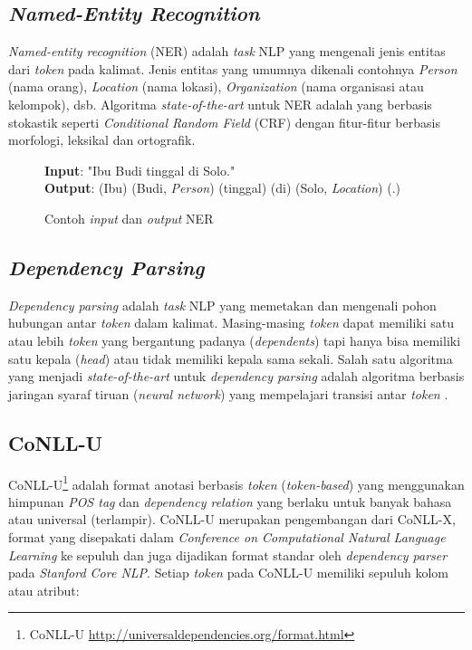\subsection{\textit{Named-Entity Recognition}}

\textit{Named-entity recognition} (NER) adalah \textit{task} NLP yang mengenali jenis entitas dari \textit{token} pada kalimat. Jenis entitas yang umumnya dikenali contohnya \textit{Person} (nama orang), \textit{Location} (nama lokasi), \textit{Organization} (nama organisasi atau kelompok), dsb. Algoritma \textit{state-of-the-art} untuk NER adalah yang berbasis stokastik seperti \textit{Conditional Random Field} (CRF) dengan fitur-fitur berbasis morfologi, leksikal dan ortografik.

\begin{figure}
	\begin{mdframed}
		\textbf{Input}: "Ibu Budi tinggal di Solo." \\		
		\textbf{Output}: (Ibu) (Budi, \textit{Person}) (tinggal) (di) (Solo, \textit{Location}) (.)
	\end{mdframed}
	\caption{Contoh \textit{input} dan \textit{output} NER}
	\label{fig:example_ner}
\end{figure}

\subsection{\textit{Dependency Parsing}}

\textit{Dependency parsing} adalah \textit{task} NLP yang memetakan dan mengenali pohon hubungan antar \textit{token} dalam kalimat. Masing-masing \textit{token} dapat memiliki satu atau lebih \textit{token} yang bergantung padanya (\textit{dependents}) tapi hanya bisa memiliki satu kepala (\textit{head}) atau tidak memiliki kepala sama sekali. Salah satu algoritma yang menjadi \textit{state-of-the-art} untuk \textit{dependency parsing} adalah algoritma berbasis jaringan syaraf tiruan (\textit{neural network}) yang mempelajari transisi antar \textit{token} \citep{chen2014fast}. 

\subsection{CoNLL-U}

CoNLL-U\footnote{CoNLL-U \url{http://universaldependencies.org/format.html}} adalah format anotasi berbasis \textit{token} (\textit{token-based}) yang menggunakan himpunan \textit{POS tag} dan \textit{dependency relation} yang berlaku untuk banyak bahasa atau universal \citep{nivre2016universal} (terlampir). CoNLL-U merupakan pengembangan dari CoNLL-X, format yang disepakati dalam \textit{Conference on Computational Natural Language Learning} ke sepuluh dan juga dijadikan format standar oleh \textit{dependency parser} pada \textit{Stanford Core NLP}. Setiap \textit{token} pada CoNLL-U memiliki sepuluh kolom atau atribut:

